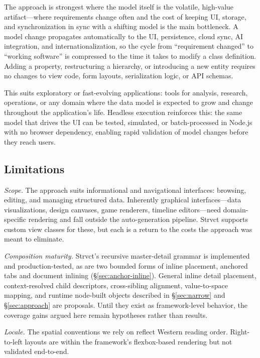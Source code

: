\documentclass[sigplan,review,anonymous,10pt]{acmart}
\begin{document}
The approach is strongest where the model itself is the volatile, high-value artifact---where requirements change often and the cost of keeping UI, storage, and synchronization in sync with a shifting model is the main bottleneck. A model change propagates automatically to the UI, persistence, cloud sync, AI integration, and internationalization, so the cycle from ``requirement changed'' to ``working software'' is compressed to the time it takes to modify a class definition. Adding a property, restructuring a hierarchy, or introducing a new entity requires no changes to view code, form layouts, serialization logic, or API schemas.

This suits exploratory or fast-evolving applications: tools for analysis, research, operations, or any domain where the data model is expected to grow and change throughout the application's life. Headless execution reinforces this: the same model that drives the UI can be tested, simulated, or batch-processed in Node.js with no browser dependency, enabling rapid validation of model changes before they reach users.

\subsection{Limitations}

\emph{Scope.} The approach suits informational and navigational interfaces: browsing, editing, and managing structured data. Inherently graphical interfaces---data visualizations, design canvases, game renderers, timeline editors---need domain-specific rendering and fall outside the auto-generation pipeline. Strvct supports custom view classes for these, but each is a return to the costs the approach was meant to eliminate.

\emph{Composition maturity.} Strvct's recursive master-detail grammar is implemented and production-tested, as are two bounded forms of inline placement, anchored tabs and document inlining (\S\ref{sec:anchor-inline}). General inline detail placement, context-resolved child descriptors, cross-sibling alignment, value-to-space mapping, and runtime node-built objects described in \S\ref{sec:narrow} and \S\ref{sec:approach} are proposals. Until they exist as framework-level behavior, the coverage gains argued here remain hypotheses rather than results.

\emph{Locale.} The spatial conventions we rely on reflect Western reading order. Right-to-left layouts are within the framework's flexbox-based rendering but not validated end-to-end.
\end{document}
